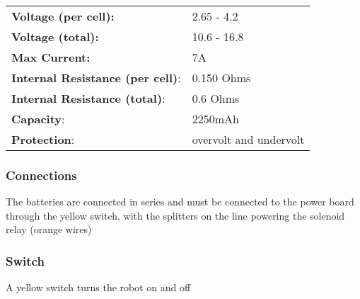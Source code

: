 \begin{tabularx}{\textwidth}{XX}
\textbf{Voltage (per cell):}	& 2.65 - 4.2 \\
\textbf{Voltage (total):}		& 10.6 - 16.8 \\
\textbf{Max Current:}			& 7A \\
\textbf{Internal Resistance (per cell)}: & 0.150 Ohms \\
\textbf{Internal Resistance (total)}: & 0.6 Ohms \\
\textbf{Capacity}: & 2250mAh \\
\textbf{Protection}: & overvolt and undervolt \\
\end{tabularx}
    
\subsubsection{Connections}
The batteries are connected in series and must be connected to the power board through the yellow switch, with the splitters on the line powering the solenoid relay (orange wires)
\subsubsection{Switch}
A yellow switch turns the robot on and off